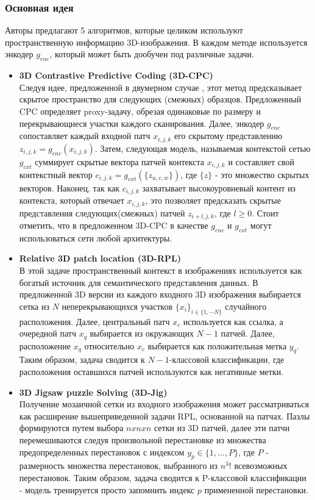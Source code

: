 \subsubsection*{Основная идея}
Авторы предлагают 5 алгоритмов, которые целиком используют пространственную информацию
3D-изображения. В каждом методе используется энкодер \(g_{enc}\), который 
может быть дообучен под различные задачи.
\begin{itemize}
    \item \textbf{3D Contrastive Predictive Coding (3D-CPC)} \\
    Следуя идее, предложенной в двумерном случае \cite{CPC}, этот метод предсказывает скрытое 
    пространство для следующих (смежных) образцов. Предложенный CPC определяет 
    proxy-задачу, обрезая одинаковые по размеру и перекрывающиеся участки каждого 
    сканирования. Далее, энкодер \(g_{enc}\) сопоставляет каждый входной патч 
    \(x_{i,j,k}\) его скрытому представлению \(z_{i,j,k}= g_{enc}(x_{i,j,k})\). Затем, 
    следующая модель, называемая контекстой сетью \(g_{cxt}\) суммирует скрытые вектора патчей
    контекста \(x_{i,j,k}\) и составляет свой контекстный вектор 
    \(c_{i,j,k}=g_{cxt}(\{z_{u,v,w}\})\), где \(\{z\}\) - это множество скрытых векторов.
    Наконец, так как \(c_{i,j,k}\) захватывает высокоуровневый контент из контекста, который 
    отвечает \(x_{i,j,k}\), это позволяет предсказать скрытые представления следующих(смежных)
    патчей \(z_{i+l,j,k}\), где \(l\geq 0\). Стоит отметить, что в предложенном 3D-CPC
    в качестве \(g_{enc}\) и \(g_{cxt}\) могут использоваться сети любой архитектуры.
    \item \textbf{Relative 3D patch location (3D-RPL)} \\
    В этой задаче пространственный контекст в изображениях используется 
    как богатый источник для семантического представления данных. В предложенной 
    3D версии из каждого входного 3D изображения выбирается сетка из \(N\)
    неперекрывающихся участков \(\{x_{i}\}_{i\in \{1, \cdots N\}}\) случайного расположения. 
    Далее, центральный патч \(x_c\) используется как ссылка, а очередной патч \(x_q\)
    выбирается из окружающих \(N-1\) патчей. Далее, расположение \(x_q\) относительно \(x_c\)
    выбирается как положительная метка \(y_q\). Таким образом, задача сводится к \(N-1\)-классовой 
    классификации, где расположения оставшихся патчей используются как негативные метки.
    \item \textbf{3D Jigsaw puzzle Solving (3D-Jig)} \\
    Получение мозаичной сетки из входного изображения может рассматриваться как 
    расширение вышеприведенной задачи RPL, основанной на патчах. Пазлы формируются
    путем выбора \(nxnxn\) сетки из 3D патчей, далее эти патчи перемешиваются следуя 
    произвольной перестановке из множества предопределенных перестановок с индексом 
    \(y_{p}\in \{1,\dots , P\}\), где \(P\) - размерность множества перестановок, выбранного
    из \(n^{3}!\) всевозможных перестановок. Таким образом, задача сводится к P-классовой 
    классификации - модель тренируется просто запомнить индекс \(p\) примененной перестановки.


\end{itemize}
